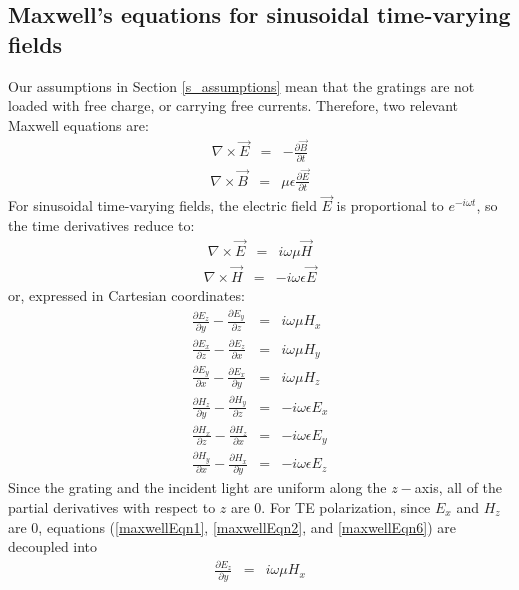 \subsection{Maxwell's equations for sinusoidal time-varying fields}
Our assumptions in Section \ref{s_assumptions} mean that the gratings are not loaded with free charge, or carrying free currents. Therefore, two relevant Maxwell equations are:
\begin{eqnarray}
\nabla \times \vec E &=& - \frac {\partial \vec B }{\partial t}
\end{eqnarray}
\begin{eqnarray}
\nabla \times \vec B &=& \mu \epsilon \frac{ \partial \vec E }{ \partial t }
\end{eqnarray}
For sinusoidal time-varying fields, the electric field $\vec E$ is proportional to $e^{-i \omega t}$, so the time derivatives reduce to:
\begin{eqnarray}
\nabla \times \vec E &=& i \omega \mu \vec H
\end{eqnarray}
\begin{eqnarray}
\nabla \times \vec H &=& - i \omega \epsilon \vec E
\end{eqnarray}
or, expressed in Cartesian coordinates:
\begin{eqnarray}
\label{maxwellEqn1}
\frac{\partial E_z}{\partial y} - \frac{\partial E_y}{\partial z} &=& i \omega \mu H_x  \\
\label{maxwellEqn2}
\frac{\partial E_x}{\partial z} - \frac{\partial E_z}{\partial x} &=& i \omega \mu H_y  \\
\label{maxwellEqn3}
\frac{\partial E_y}{\partial x} - \frac{\partial E_x}{\partial y} &=& i \omega \mu H_z  \\
\label{maxwellEqn4}
\frac{\partial H_z}{\partial y} - \frac{\partial H_y}{\partial z} &=& -i \omega \epsilon E_x  \\
\label{maxwellEqn5}
\frac{\partial H_x}{\partial z} - \frac{\partial H_z}{\partial x} &=& -i \omega \epsilon E_y \\
\label{maxwellEqn6}
\frac{\partial H_y}{\partial x} - \frac{\partial H_x}{\partial y} &=& -i \omega \epsilon E_z
\end{eqnarray}
Since the grating and the incident light are uniform along the $z-$axis, all of the partial derivatives with respect to $z$ are 0.  For TE polarization, since $E_x$ and $H_z$ are 0, equations (\ref{maxwellEqn1}, \ref{maxwellEqn2}, and \ref{maxwellEqn6}) are decoupled into
\begin{eqnarray}
\frac{\partial E_z}{\partial y} &=& i \omega \mu H_x
\label{mete1}
\end{eqnarray}
